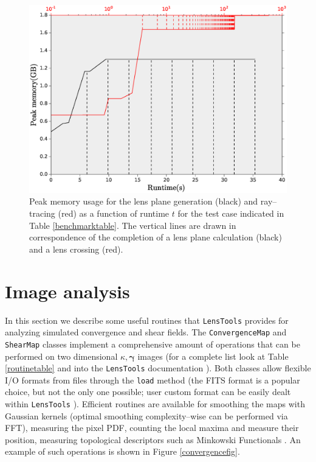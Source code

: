 \documentclass[5p]{elsarticle}
\newcommand{\ttt}[1]{\texttt{#1}}
\newcommand{\LT}{\texttt{LensTools} }
\begin{document}
\begin{figure}
\begin{center}
\includegraphics[scale=0.3]{Figures/memory_usage.eps}
\caption{Peak memory usage for the lens plane generation (black) and ray--tracing (red) as a function of runtime $t$ for the test case indicated in Table \ref{benchmarktable}. The vertical lines are drawn in correspondence of the completion of a lens plane calculation (black) and a lens crossing (red).}
\label{memoryfig}
\end{center}
\end{figure}


\section{Image analysis}
%
In this section we describe some useful routines that \LT provides for analyzing simulated convergence and shear fields. The \ttt{ConvergenceMap} and \ttt{ShearMap} classes implement a comprehensive amount of operations that can be performed on two dimensional $\kappa,\pmb{\gamma}$ images (for a complete list look at Table \ref{routinetable} and into the \LT documentation \citep{lenstoolsdocs}). Both classes allow flexible I/O formats from files through the \ttt{load} method (the FITS format \citep{cfitsio} is a popular choice, but not the only one possible; user custom format can be easily dealt within \LT). Efficient routines are available for smoothing the maps with Gaussian kernels (optimal smoothing complexity--wise can be performed via FFT), measuring the pixel PDF, counting the local maxima and measure their position, measuring topological descriptors such as Minkowski Functionals \citep{MatsubaraMink}. An example of such operations is shown in Figure \ref{convergencefig}.  
\end{document}
